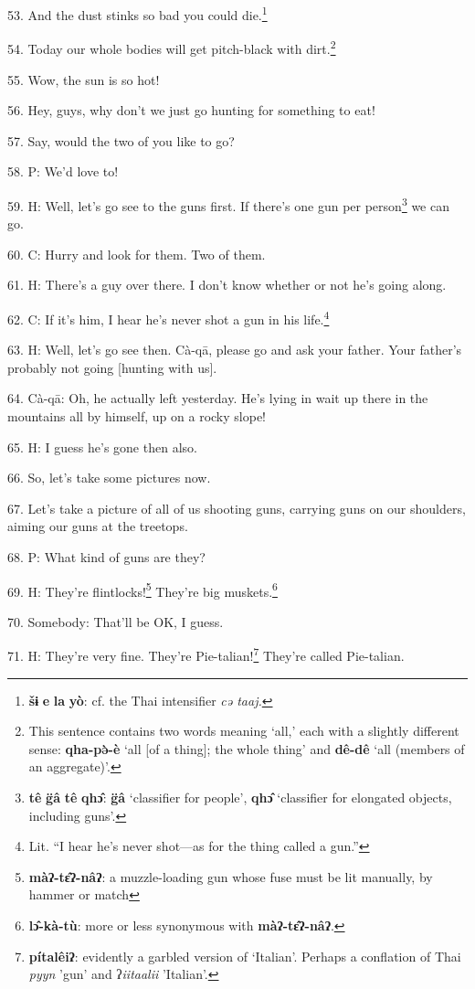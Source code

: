 53. And the dust stinks so bad you could die.\footnote{\textbf{šɨ} \textbf{e} \textbf{la} \textbf{yò}: cf. the Thai intensifier\textit{\textbf{ }}\textit{cə taaj.}}

54. Today our whole bodies will get pitch-black with dirt.\footnote{This sentence contains two words meaning `all,' each with a slightly different sense: \textbf{qha-pə̀-è} `all [of a thing]; the whole thing' and \textbf{dê-dê} `all (members of an aggregate)'.}

55. Wow, the sun is so hot!

56. Hey, guys, why don't we just go hunting for something to eat!

57. Say, would the two of you like to go?

58. P: We'd love to!

59. H: Well, let's go see to the guns first. If there's one gun per person\footnote{\textbf{tê} \textbf{g̈â} \textbf{tê} \textbf{qhɔ̂}: \textbf{g̈â} `classifier for people', \textbf{qhɔ̂} `classifier for elongated objects, including guns'.}
we can go.

60. C: Hurry and look for them. Two of them.

61. H: There's a guy over there. I don't know whether or not he's going along.

62. C: If it's him, I hear he's never shot a gun in his life.\footnote{Lit. ``I hear he's never shot---as for the thing called a gun.''}

63. H: Well, let's go see then. Cà-qā, please go and ask your father. Your father's
probably not going [hunting with us].

64. Cà-qā: Oh, he actually left yesterday. He's lying in wait up there in the
mountains all by himself, up on a rocky slope!

65. H: I guess he's gone then also.

66. So, let's take some pictures now.

67. Let's take a picture of all of us shooting guns, carrying guns on our shoulders,
aiming our guns at the treetops.

68. P: What kind of guns are they?

69. H: They're flintlocks!\footnote{\textbf{màʔ-tɛ̂ʔ-nâʔ}: a muzzle-loading gun whose fuse must be lit manually, by hammer or match} They're big muskets.\footnote{\textbf{lɔ̂-kà-tù}: more or less synonymous with \textbf{màʔ-tɛ̂ʔ-nâʔ}.}

70. Somebody: That'll be OK, I guess.

71. H: They're very fine. They're Pie-talian!\footnote{\textbf{pítalêiʔ}: evidently a garbled version of `Italian'. Perhaps a conflation of Thai \textit{pyyn} 'gun' and ʔ\textit{iitaalii} 'Italian'.} They're called Pie-talian.


